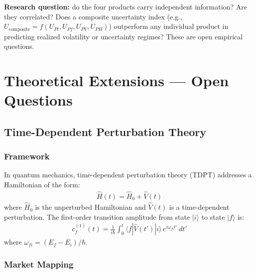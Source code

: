 \documentclass[preprint,12pt]{elsarticle}
\begin{document}
\textbf{Research question:} do the four products carry independent information? Are they correlated? Does a composite uncertainty index (e.g., $U_{\mathrm{composite}} = f(U_{Pt}, U_{Pf}, U_{PV}, U_{PH})$) outperform any individual product in predicting realized volatility or uncertainty regimes? These are open empirical questions.

\section{Theoretical Extensions --- Open Questions}

\subsection{Time-Dependent Perturbation Theory}

\subsubsection{Framework}

In quantum mechanics, time-dependent perturbation theory (TDPT) addresses a Hamiltonian of the form:
\begin{align}
    \hat{H}(t) = \hat{H}_0 + \hat{V}(t)
\end{align}
where $\hat{H}_0$ is the unperturbed Hamiltonian and $\hat{V}(t)$ is a time-dependent perturbation. The first-order transition amplitude from state $|i\rangle$ to state $|f\rangle$ is:
\begin{align}
    c_f^{(1)}(t) = \frac{1}{i\hbar} \int_0^t \langle f | \hat{V}(t') | i \rangle\, e^{i\omega_{fi} t'}\, dt'
\end{align}
where $\omega_{fi} = (E_f - E_i)/\hbar$.

\subsubsection{Market Mapping}
\end{document}
